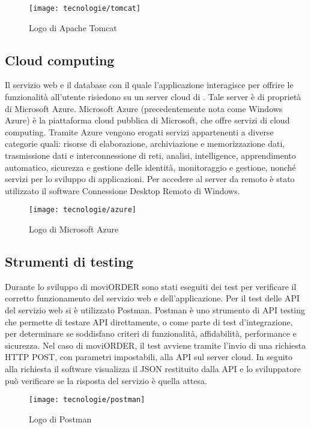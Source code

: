 \begin{figure}[!h] 
    \centering 
    \texttt{[image: tecnologie/tomcat]} 
    \caption{Logo di Apache Tomcat}
\end{figure}

\subsection{Cloud computing}

Il servizio web e il database con il quale l'applicazione interagisce per offrire le funzionalità all'utente risiedono su un server cloud di \visione{}. Tale server è di proprietà di Microsoft Azure. Microsoft Azure (precedentemente nota come Windows Azure) è la piattaforma cloud pubblica di Microsoft, che offre servizi di cloud computing. Tramite Azure vengono erogati servizi appartenenti a diverse categorie quali: risorse di elaborazione, archiviazione e memorizzazione dati, trasmissione dati e interconnessione di reti, analisi, intelligence, apprendimento automatico, sicurezza e gestione delle identità, monitoraggio e gestione, nonché servizi per lo sviluppo di applicazioni. Per accedere al server da remoto è stato utilizzato il software Connessione Desktop Remoto di Windows.

\begin{figure}[!h] 
    \centering 
    \texttt{[image: tecnologie/azure]} 
    \caption{Logo di Microsoft Azure}
\end{figure}

\subsection{Strumenti di testing}

Durante lo sviluppo di moviORDER sono stati eseguiti dei test per verificare il corretto funzionamento del servizio web e dell'applicazione. Per il test delle API del servizio web si è utilizzato Postman. Postman è uno strumento di API testing che permette di testare API direttamente, o come parte di test d'integrazione, per determinare se soddisfano criteri di funzionalità, affidabilità, performance e sicurezza. Nel caso di moviORDER, il test avviene tramite l'invio di una richiesta HTTP POST, con parametri impostabili, alla API sul server cloud. In seguito alla richiesta il software visualizza il JSON restituito dalla API e lo sviluppatore può verificare se la risposta del servizio è quella attesa.

\begin{figure}[!h] 
    \centering 
    \texttt{[image: tecnologie/postman]} 
    \caption{Logo di Postman}
\end{figure}

